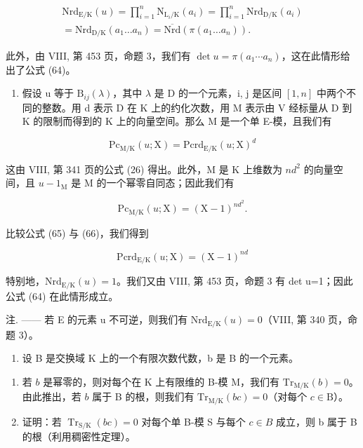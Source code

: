 \[
\begin{array}{c} \mathrm{Nrd} _ {\mathrm{E/K}} (u) = \prod_ {i = 1} ^ {n} \mathrm{N} _ {\mathrm{L} _ {i} / \mathrm{K}} (a _ {i}) = \prod_ {i = 1} ^ {n} \mathrm{Nrd} _ {\mathrm{D/K}} (a _ {i}) \\ = \mathrm{Nrd} _ {\mathrm{D/K}} (a _ {1} \dots a _ {n}) = \overline {{\mathrm{Nrd}}} (\pi (a _ {1} \dots a _ {n}))  . \end{array}
\]

此外，由 VIII, 第 453 页，命题 3，我们有 \(\det u = \pi(a_{1} \cdots a_{n})\)，这在此情形给出了公式 (64)。

\begin{enumerate}
\def\labelenumi{\Alph{enumi})}
\setcounter{enumi}{1}
\tightlist
\item
  假设 u 等于 \(\mathrm{B}_{ij}(\lambda)\)，其中 \(\lambda\) 是 D 的一个元素，i, j 是区间 \([1,n]\) 中两个不同的整数。用 d 表示 D 在 K 上的约化次数，用 M 表示由 V 经标量从 D 到 K 的限制而得到的 K 上的向量空间。那么 M 是一个单 E-模，且我们有
\end{enumerate}

\[
\mathrm{Pc} _ {\mathrm{M/K}} (u; \mathrm{X}) = \mathrm{Pcrd} _ {\mathrm{E/K}} (u; \mathrm{X}) ^ {d}\tag{65}
\]

这由 VIII, 第 341 页的公式 (26) 得出。此外，M 是 K 上维数为 \(nd^2\) 的向量空间，且 \(u - 1_{\mathrm{M}}\) 是 M 的一个幂零自同态；因此我们有

\[
\mathrm{Pc} _ {\mathrm{M/K}} (u; \mathrm{X}) = (\mathrm{X} - 1) ^ {n d ^ {2}}.\tag{66}
\]

比较公式 (65) 与 (66)，我们得到

\[
\mathrm{Pcrd} _ {\mathrm{E/K}} (u; \mathrm{X}) = (\mathrm{X} - 1) ^ {n d}\tag{67}
\]

特别地，\(\mathrm{Nrd}_{\mathrm{E}/\mathrm{K}}(u)=1\)。我们又由 VIII, 第 453 页，命题 3 有 det u=1；因此公式 (64) 在此情形成立。

注. —— 若 E 的元素 u 不可逆，则我们有 \(\mathrm{Nrd}_{\mathrm{E}/\mathrm{K}}(u)=0\)（VIII, 第 340 页，命题 3）。


\begin{enumerate}
\def\labelenumi{\arabic{enumi})}
\tightlist
\item
  设 B 是交换域 K 上的一个有限次数代数，b 是 B 的一个元素。
\end{enumerate}

\begin{enumerate}
\def\labelenumi{\alph{enumi})}
\item
  若 \(b\) 是幂零的，则对每个在 K 上有限维的 B-模 M，我们有 \(\mathrm{Tr}_{\mathrm{M / K}}(b) = 0\)。由此推出，若 \(b\) 属于 B 的根，则我们有 \(\mathrm{Tr}_{\mathrm{M / K}}(bc) = 0\)（对每个 \(c \in \mathrm{B}\)）。
\item
  证明：若 \(\operatorname{Tr}_{\mathrm{S}/\mathrm{K}}(bc)=0\) 对每个单 B-模 S 与每个 \(c\in B\) 成立，则 b 属于 B 的根（利用稠密性定理）。
\end{enumerate}

